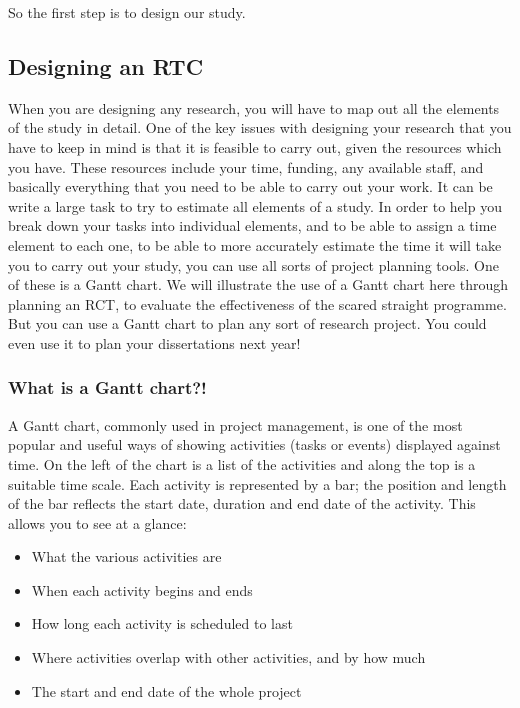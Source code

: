 \documentclass[]{book}
\providecommand{\tightlist}{%
  \setlength{\itemsep}{0pt}\setlength{\parskip}{0pt}}
\theoremstyle{definition}
\theoremstyle{definition}
\theoremstyle{definition}
\theoremstyle{remark}
\begin{document}
So the first step is to design our study.

\hypertarget{designing-an-rtc}{%
\subsection{Designing an RTC}\label{designing-an-rtc}}

When you are designing any research, you will have to map out all the
elements of the study in detail. One of the key issues with designing
your research that you have to keep in mind is that it is feasible to
carry out, given the resources which you have. These resources include
your time, funding, any available staff, and basically everything that
you need to be able to carry out your work. It can be write a large task
to try to estimate all elements of a study. In order to help you break
down your tasks into individual elements, and to be able to assign a
time element to each one, to be able to more accurately estimate the
time it will take you to carry out your study, you can use all sorts of
project planning tools. One of these is a Gantt chart. We will
illustrate the use of a Gantt chart here through planning an RCT, to
evaluate the effectiveness of the scared straight programme. But you can
use a Gantt chart to plan any sort of research project. You could even
use it to plan your dissertations next year!

\hypertarget{what-is-a-gantt-chart}{%
\subsubsection{What is a Gantt chart?!}\label{what-is-a-gantt-chart}}

A Gantt chart, commonly used in project management, is one of the most
popular and useful ways of showing activities (tasks or events)
displayed against time. On the left of the chart is a list of the
activities and along the top is a suitable time scale. Each activity is
represented by a bar; the position and length of the bar reflects the
start date, duration and end date of the activity. This allows you to
see at a glance:

\begin{itemize}
\tightlist
\item
  What the various activities are
\item
  When each activity begins and ends
\item
  How long each activity is scheduled to last
\item
  Where activities overlap with other activities, and by how much
\item
  The start and end date of the whole project
\end{itemize}
\end{document}
